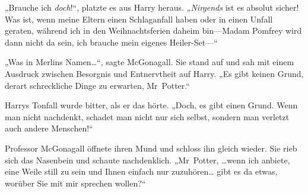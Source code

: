 „Brauche ich \emph{doch}!“, platzte es aus Harry heraus. \emph{„Nirgends} ist es absolut sicher! Was ist, wenn meine Eltern einen Schlaganfall haben oder in einen Unfall geraten, während ich in den Weihnachtsferien daheim bin—Madam Pomfrey wird dann nicht da sein, ich brauche mein eigenes Heiler-Set—“

„Was in Merlins Namen…“, sagte McGonagall. Sie stand auf und sah mit einem Ausdruck zwischen Besorgnis und Entnervtheit auf Harry. „Es gibt keinen Grund, derart schreckliche Dinge zu erwarten, Mr~Potter.“

Harrys Tonfall wurde bitter, als er das hörte. „Doch, es gibt einen Grund. Wenn man nicht nachdenkt, schadet man nicht nur sich selbst, sondern man verletzt auch andere Menschen!“

Professor McGonagall öffnete ihren Mund und schloss ihn gleich wieder. Sie rieb sich das Nasenbein und schaute nachdenklich. „Mr~Potter, …wenn ich anbiete, eine Weile still zu sein und Ihnen einfach nur zuzuhören… gibt es da etwas, worüber Sie mit mir sprechen wollen?“

